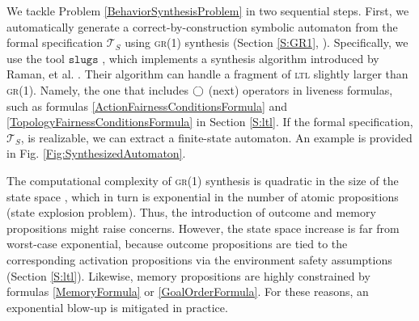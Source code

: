 
We tackle Problem \ref{BehaviorSynthesisProblem} in two sequential steps.
First, we automatically generate a correct-by-construction symbolic automaton from the formal specification $\mathcal{T}_S$ using \textsc{gr(1)} synthesis (Section \ref{S:GR1}, \cite{Bloem2012GR1}).
Specifically, we use the tool $\mathtt{slugs}$ \cite{SLUGS}, which implements a synthesis algorithm introduced by Raman, et al. \cite{Vasu2013ICRA, Vasu2015TRO}.
Their algorithm can handle a fragment of \textsc{ltl} slightly larger than \textsc{gr(1)}.
Namely, the one that includes $\operatorname{\bigcirc}$ (next) operators in liveness formulas, such as formulas \eqref{ActionFairnessConditionsFormula} and \eqref{TopologyFairnessConditionsFormula} in Section \ref{S:ltl}.
If the formal specification, $\mathcal{T}_S$, is realizable, we can extract a finite-state automaton.
An example is provided in Fig. \ref{Fig:SynthesizedAutomaton}.

The computational complexity of \textsc{gr(1)} synthesis is quadratic in the size of the state space \cite{Bloem2012GR1}, which in turn is exponential in the number of atomic propositions (state explosion problem).
Thus, the introduction of outcome and memory propositions might raise concerns.
However, the state space increase is far from worst-case exponential, because outcome propositions are tied to the corresponding activation propositions via the environment safety assumptions (Section \ref{S:ltl}).
Likewise, memory propositions are highly constrained by formulas \eqref{MemoryFormula} or \eqref{GoalOrderFormula}.
For these reasons, an exponential blow-up is mitigated in practice.

